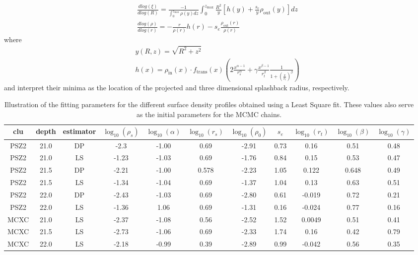 \documentclass[a4paper,fleqn,usenatbib]{mnras}
\begin{document}
\begin{align}
\frac{dlog(\xi )}{dlog(R)}=\frac{-1}{\int_0^{z_{\mathrm{max}}}\rho (y)dz} \int_0^{z_{\mathrm{max}}}\frac{R^2}{y}\left[ h(y)+ \frac{s_e}{y}\rho_{\mathrm{out}}(y)\right]dz   \\
\frac{dlog(\rho)}{dlog(r)}=-\frac{r}{\rho(r)}h(r)-s_e\frac{\rho_{\mathrm{out}}(r)}{\rho(r)}
\end{align}
where
\begin{align}
y(R,z)=\sqrt{R^2+z^2} \\
h(x)=\rho_{\mathrm{in}}(x) \cdot f_{\mathrm{trans}}(x) \left( 2\frac{x^{\alpha -1}}{r_s^{\alpha }}+\gamma \frac{x^{\beta -1}}{r_t^{\beta }}\frac{1}{1+\left( \frac{x}{r_t}\right)^{\beta }} \right)
\end{align}
and interpret their minima as the location of the projected and three dimensional splashback radius, respectively.

\begin{table}
    \centering
    \caption{Illustration of the fitting parameters for the different surface density profiles obtained using a Least Square fit. These values also serve as the initial parameters for the MCMC chains.}
    \label{tab:inits}
    \begin{tabular}{|c|c|c|c|c|c|c|c|c|c|c|}
    \hline 
    clu & depth & estimator& $\log_{10}(\rho_s)$ & $\log_{10}(\alpha)$ & $\log_{10}(r_s)$ & $\log_{10}(\rho_0)$ & $s_e$ & $\log_{10}(r_t)$ & $\log_{10}(\beta)$ & $\log_{10}(\gamma)$ \\ 
    \hline 
    PSZ2 & 21.0 & DP & -2.3 & -1.00 & 0.69 & -2.91 & 0.73 & 0.16 & 0.51 & 0.48 \\ 
    \hline 
     PSZ2 & 21.0 & LS & -1.23 & -1.03 & 0.69 & -1.76 & 0.84 & 0.15 & 0.53 & 0.47\\ 
    \hline 
    PSZ2 & 21.5 & DP & -2.21 & -1.00 & 0.578 & -2.23 & 1.05 & 0.122 & 0.648 & 0.49\\ 
    \hline 
    PSZ2 & 21.5 & LS & -1.34 & -1.04 & 0.69 & -1.37 & 1.04 & 0.13 & 0.63 & 0.51\\ 
    \hline 
    PSZ2 & 22.0 & DP & -2.43 & -1.03 & 0.69 & -2.80 & 0.61 & -0.019 & 0.72 & 0.21\\
    \hline
    PSZ2 & 22.0 & LS & -1.36 & 1.06 & 0.69 & -1.31 & 0.16 & -0.024 & 0.77 & 0.16\\
    \hline
    MCXC & 21.0 & LS & -2.37 & -1.08 & 0.56 & -2.52 & 1.52 & 0.0049 & 0.51 & 0.41 \\
    \hline
    MCXC & 21.5 & LS & -2.73 & -1.06 & 0.69 & -2.33 & 1.74 & 0.16 & 0.42 & 0.79\\
    \hline
    MCXC & 22.0 & LS & -2.18 & -0.99 & 0.39 & -2.89 & 0.99 & -0.042 & 0.56 & 0.35\\
    \hline
    \end{tabular} 
\end{table}
\end{document}
